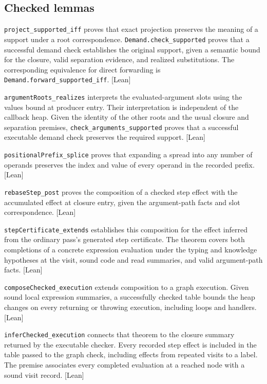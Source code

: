 \documentclass[10pt,a4paper]{article}
\theoremstyle{definition}
\newcommand{\lean}[1]{\textcolor{leanc}{\texttt{\small #1}}}
\newcommand{\status}[1]{\textcolor{leanc}{\textsf{\small[#1]}}}
\begin{document}
\subsection{Checked lemmas}

\lean{project\_supported\_iff} proves that exact projection preserves
the meaning of a support under a root correspondence.
\lean{Demand.check\_supported} proves that a successful demand check
establishes the original support, given a semantic bound for the closure,
valid separation evidence, and realized substitutions.
The corresponding equivalence for direct forwarding is
\lean{Demand.forward\_supported\_iff}. \status{Lean}

\lean{argumentRoots\_realizes} interprets the evaluated-argument slots
using the values bound at producer entry. Their interpretation is
independent of the callback heap. Given the identity of the other
roots and the usual closure and separation premises,
\lean{check\_arguments\_supported} proves that a successful executable
demand check preserves the required support. \status{Lean}

\lean{positionalPrefix\_splice} proves that expanding a spread into
any number of operands preserves the index and value of every operand
in the recorded prefix. \status{Lean}

\lean{rebaseStep\_post} proves the composition of a checked step effect
with the accumulated effect at closure entry, given the argument-path
facts and slot correspondence. \status{Lean}

\lean{stepCertificate\_extends} establishes this composition for the
effect inferred from the ordinary pass's generated step certificate.
The theorem covers both completions of a concrete expression evaluation
under the typing and knowledge hypotheses at the visit, sound code and
read summaries, and valid argument-path facts. \status{Lean}

\lean{composeChecked\_execution} extends composition to a graph
execution. Given sound local expression summaries, a successfully
checked table bounds the heap changes on every returning or throwing
execution, including loops and handlers. \status{Lean}

\lean{inferChecked\_execution} connects that theorem to the closure
summary returned by the executable checker. Every recorded step effect
is included in the table passed to the graph check, including effects
from repeated visits to a label. The premise associates every completed
evaluation at a reached node with a sound visit record. \status{Lean}
\end{document}
